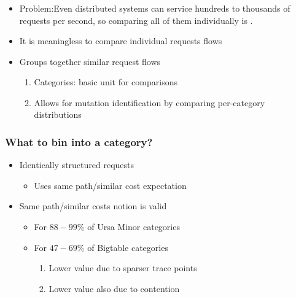 \documentclass[11pt]{beamer}
\begin{document}
\begin{frame}
\frametitle{\secname}
\begin{itemize}
  \item \alert{Problem}:Even  distributed systems can service
  hundreds to thousands of requests per second, so comparing all of
  them individually is .
  \item It is meaningless to compare individual requests flows\pause
  \item Groups together similar request flows
  \begin{enumerate}
    \item Categories: basic unit for comparisons
    \item Allows for mutation identification by comparing per-category
    distributions
  \end{enumerate}
\end{itemize}
\end{frame}

\begin{frame}
\frametitle{What to bin into a category?}
\begin{itemize}
  \item Identically structured requests
  \begin{itemize}
    \item Uses same path/similar cost expectation
  \end{itemize}
  \vskip11pt
  \item Same path/similar costs notion is valid
  \begin{itemize}
    \item For $88-99\%$ of Ursa Minor categories
    \item For $47-69\%$ of Bigtable categories
    \begin{enumerate}
      \item Lower value due to sparser trace points
      \item Lower value also due to contention
    \end{enumerate}
  \end{itemize}
\end{itemize}
\end{frame}
\end{document}
